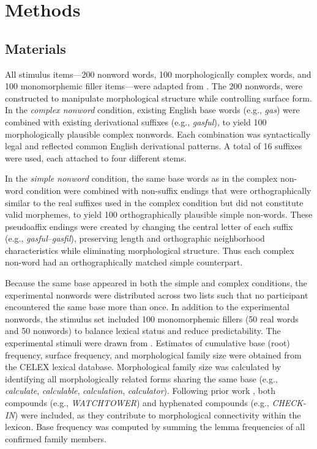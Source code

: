 \documentclass[utf8]{FrontiersinHarvard} %
\begin{document}
	\section{Methods}
	
	\subsection{Materials}
	
	All stimulus items---200 nonword words, 100 morphologically complex words, and 100 monomorphemic filler items---were adapted from \citet{sawiIndividualDifferencesSensitivity2016}. The 200 nonwords, were constructed to manipulate morphological structure while controlling surface form. In the \textit{complex nonword} condition, existing English base words (e.g., \textit{gas}) were combined with existing derivational suffixes (e.g., \textit{gasful}), to yield 100 morphologically plausible complex nonwords. Each combination was syntactically legal and reflected common English derivational patterns. A total of 16 suffixes were used, each attached to four different stems.
	
	In the \textit{simple nonword} condition, the same base words as in the complex non-word condition were combined with non-suffix endings that were orthographically similar to the real suffixes used in the complex condition but did not constitute valid morphemes, to yield 100 orthographically plausible simple non-words. These pseudoaffix endings were created by changing the central letter of each suffix (e.g., \textit{gasful}–\textit{gasfil}), preserving length and orthographic neighborhood characteristics while eliminating morphological structure. Thus each complex non-word had an orthographically matched simple counterpart.
	
	Because the same base appeared in both the simple and complex conditions, the experimental nonwords were distributed across two lists such that no participant encountered the same base more than once. In addition to the experimental nonwords, the stimulus set included 100 monomorphemic fillers (50 real words and 50 nonwords) to balance lexical status and reduce predictability. The experimental stimuli were drawn from \citet{sawiIndividualDifferencesSensitivity2016}.
	Estimates of cumulative base (root) frequency, surface frequency, and morphological family size were obtained from the CELEX lexical database. Morphological family size was calculated by identifying all morphologically related forms sharing the same base (e.g., \textit{calculate}, \textit{calculable}, \textit{calculation}, \textit{calculator}). Following prior work \citep[e.g.,][]{dejongMorphologicalFamilySize2000, dejongProcessingRepresentationDutch2002}, both compounds (e.g., \textit{WATCHTOWER}) and hyphenated compounds (e.g., \textit{CHECK-IN}) were included, as they contribute to morphological connectivity within the lexicon. Base frequency was computed by summing the lemma frequencies of all confirmed family members.
	
\end{document}
